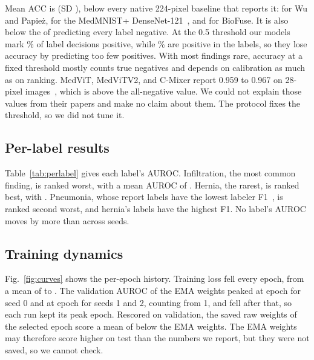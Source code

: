 \documentclass[conference]{IEEEtran}
\newif\ifanycitation
\let\citeAnyKey\cite
\renewcommand{\cite}{\global\anycitationtrue\citeAnyKey}
\begin{document}
Mean ACC is \testAccMean{} (SD \testAccSD{}), below every native 224-pixel baseline
that reports it: \baseWuAcc{} for Wu and Papie\.{z}, \basePlusAcc{} for the MedMNIST+
DenseNet-121~\cite{doerrich2025medmnistplus}, and \baseBestAcc{} for BioFuse. It is also
below the \allNegAcc{} of predicting every label negative. At the 0.5 threshold our models
mark \predPosPct\% of label decisions positive, while \% are positive in the
labels, so they lose accuracy by predicting too few positives. With most findings rare,
accuracy at a fixed threshold mostly counts true negatives and depends on calibration as
much as on ranking. MedViT, MedViTV2, and C-Mixer report 0.959 to 0.967 on 28-pixel
images~\cite{manzari2023medvit,manzari2025medvitv2,zheng2023cmixer}, which is above the
all-negative value. We could not explain those values from their papers and make no claim
about them. The protocol fixes the threshold, so we did not tune it.

\subsection{Per-label results}



Table~\ref{tab:perlabel} gives each label's AUROC. Infiltration, the most common
finding, is ranked worst, with a mean AUROC of \lowLabelAuroc{}. Hernia, the rarest, is
ranked best, with \highLabelAuroc{}. Pneumonia, whose report labels have the lowest
labeler F1~\cite{wang2017chestxray8}, is ranked second worst, and hernia's labels have the
highest F1. No label's AUROC moves by more than
\perLabelSpreadMax{} across seeds.

\subsection{Training dynamics}

Fig.~\ref{fig:curves} shows the per-epoch history. Training loss fell every epoch, from a
mean of \trainLossFirst{} to \trainLossLast{}. The validation AUROC of the EMA weights
peaked at epoch \selectedEpochSeedZero{} for seed 0 and at epoch \selectedEpochSeedOne{}
for seeds 1 and 2, counting from 1, and fell after that, so each run kept its peak epoch. Rescored on
validation, the saved raw weights of the selected epoch score a mean of
\emaMinusRawMean{} below the EMA weights. The EMA weights may therefore score higher on
test than the numbers we report, but they were not saved, so we cannot check.
\end{document}
